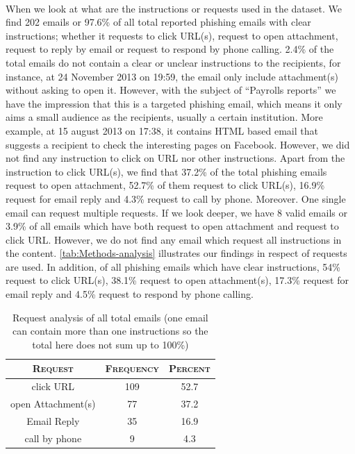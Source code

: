 \ 

When we look at what are the instructions or requests used in the
dataset. We find 202 emails or 97.6\% of all total reported phishing
emails with clear instructions; whether it requests to click URL(s),
request to open attachment, request to reply by email or request to
respond by phone calling. 2.4\% of the total emails do not contain
a clear or unclear instructions to the recipients, for instance, at
24 November 2013 on 19:59, the email only include attachment(s) without
asking to open it. However, with the subject of ``Payrolls reports''
we have the impression that this is a targeted phishing email, which
means it only aims a small audience as the recipients, usually a certain
institution. More example, at 15 august 2013 on 17:38, it contains
HTML based email that suggests a recipient to check the interesting
pages on Facebook. However, we did not find any instruction to click
on URL nor other instructions. Apart from the instruction to click
URL(s), we find that 37.2\% of the total phishing emails request to
open attachment, 52.7\% of them request to click URL(s), 16.9\% request
for email reply and 4.3\% request to call by phone. Moreover. One
single email can request multiple requests. If we look deeper, we
have 8 valid emails or 3.9\% of all emails which have both request
to open attachment and request to click URL. However, we do not find
any email which request all instructions in the content. \autoref{tab:Methods-analysis}
illustrates our findings in respect of requests are used. In addition,
of all phishing emails which have clear instructions, 54\% request
to click URL(s), 38.1\% request to open attachment(s), 17.3\% request
for email reply and 4.5\% request to respond by phone calling.

\begin{table}[h]
\begin{centering}
\begin{tabular}{ccc}
\toprule 
\textsc{\small{}Request} & \textsc{\small{}Frequency} & \textsc{\small{}Percent}\tabularnewline
\midrule
\midrule 
{\small{}click URL} & {\small{}109} & {\small{}52.7}\tabularnewline
\midrule 
{\small{}open Attachment(s)} & {\small{}77} & {\small{}37.2}\tabularnewline
\midrule 
{\small{}Email Reply} & {\small{}35} & 16.9\tabularnewline
\midrule 
{\small{}call by phone} & {\small{}9} & {\small{}4.3}\tabularnewline
\bottomrule
\end{tabular}\protect\caption{\label{tab:Methods-analysis}Request analysis of all total emails
(one email can contain more than one instructions so the total here
does not sum up to 100\%)}

\par\end{centering}

%
%
\end{table}


